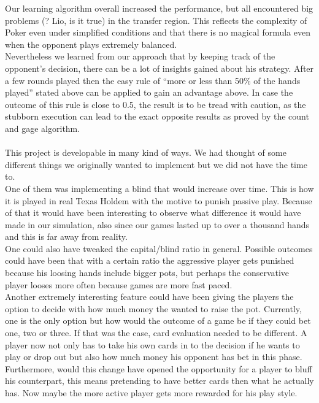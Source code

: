 \documentclass[11pt]{article}
\begin{document}
Our learning algorithm overall increased the performance, but all encountered big problems (? Lio, is it true) in the transfer region. This reflects the complexity of Poker even under simplified conditions and that there is no magical formula even when the opponent plays extremely balanced.\\

Nevertheless we learned from our approach that by keeping track of the opponent’s decision, there can be a lot of insights gained about his strategy. After a few rounds played then the easy rule of “more or less than 50\% of the hands played” stated above can be applied to gain an advantage above. In case the outcome of this rule is close to 0.5, the result is to be tread with caution, as the stubborn execution can lead to the exact opposite results as proved by the count and gage algorithm.\\ \\

This project is developable in many kind of ways. We had thought of some different things we originally wanted to implement but we did not have the time to. \\
One of them was implementing a blind that would increase over time. This is how it is played in real Texas Holdem with the motive to punish passive play. Because of that it would have been interesting to observe what difference it would have made in our simulation, also since our games lasted up to over a thousand hands and this is far away from reality.\\

One could also have tweaked the capital/blind ratio in general. Possible outcomes could have been that with a certain ratio the aggressive player gets punished because his loosing hands include bigger pots, but perhaps the conservative player looses more often because games are more fast paced.\\

Another extremely interesting feature could have been giving the players the option to decide with how much money the wanted to raise the pot. Currently, one is the only option but how would the outcome of a game be if they could bet one, two or three. If that was the case, card evaluation needed to be different. A player now not only has to take his own cards in to the decision if he wants to play or drop out but also how much money his opponent has bet in this phase. Furthermore, would this change have opened the opportunity for a player to bluff his counterpart, this means pretending to have better cards then what he actually has. Now maybe the more active player gets more rewarded for his play style.\\
\end{document}
